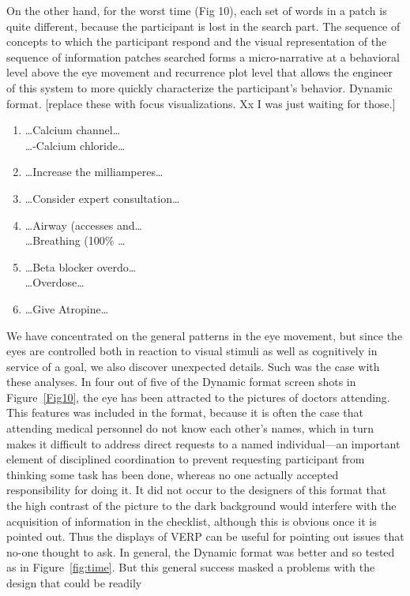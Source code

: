 \documentclass{sigchi}
\begin{document}
On the other hand, for the worst time (Fig 10), each set of words in a
patch is quite different, because the participant is lost in the search
part. The sequence of concepts to which the participant respond and the
visual representation of the sequence of information patches searched forms
a micro-narrative at a behavioral level above the eye movement and
recurrence plot level that allows the engineer of this system to more
quickly characterize the participant’s behavior. Dynamic format. [replace
these with focus visualizations. Xx I was just waiting for those.]

\begin{enumerate}
	\item \ldots Calcium channel\ldots  \\
		\ldots -Calcium chloride\ldots  \\ 
	  
	\item \ldots Increase the milliamperes\ldots \\

	\item \ldots Consider expert consultation\ldots  
	\item  \ldots Airway (accesses and\ldots  \\
		\ldots Breathing (100\% \ldots \\
	\item	\ldots Beta blocker overdo\ldots  \\
		\ldots Overdose\ldots 
	\item  \ldots Give Atropine\ldots 

\end{enumerate}

We have concentrated on the general patterns in the eye movement,
but since the eyes are controlled both in reaction to visual
stimuli as well as cognitively in service of a goal, we also
discover unexpected details. Such was the case with these
analyses. In four out of five of the Dynamic format screen shots
in Figure~\ref{Fig10}, the eye has been attracted to the pictures of doctors
attending. This features was included in the format, because it
is often the case that attending medical personnel do not know
each other’s names, which in turn makes it difficult to address
direct requests to a named individual—an important element of
disciplined coordination to prevent requesting participant from
thinking some task has been done, whereas no one actually
accepted responsibility for doing it. It did not occur to the
designers of this format that the high contrast of the picture to
the dark background would interfere with the acquisition of
information in the checklist, although this is obvious once it is
pointed out. Thus the displays of VERP can be useful for pointing
out issues that no-one thought to ask. In general, the Dynamic
format was better and so tested as in Figure~\ref{fig:time}. But this general
success masked a  problems with the design that could be readily
\end{document}
